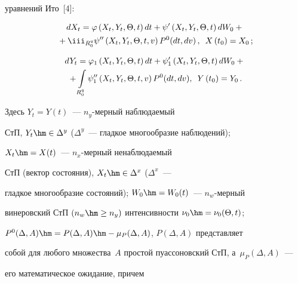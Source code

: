 уравнений Ито~[4]:

    \begin{multline}

    dX_t =\varphi \left(X_t,Y_t,\Theta, t\right) dt + \psi' \left(X_t,Y_t,\Theta, t\right) dW_0 

+{}\\

{}+\iii_{R_0^q} \psi''    \left(X_t,Y_t,\Theta, t,v\right) P^0 (dt, dv)\,,\enskip 

X\left(t_0\right) = X_0\,;\label{e2.1-s2}

\end{multline}



\vspace*{-12pt}



\noindent

    \begin{multline}

    dY_t =\varphi_1 \left(X_t,Y_t,\Theta, t\right) dt +

    \psi_1' \left(X_t,Y_t,\Theta, t\right) dW_0 + {}\\

    {}+

    \int\limits_{R_0^q} \psi_1'' \left(X_t,Y_t,\Theta, t,v\right) P^0

    (dt,dv),\enskip Y\left(t_0\right) = Y_0\,.\label{e2.2-s2}

    \end{multline}

Здесь $Y_t=Y(t)$~--- $n_y$-мер\-ный наблюдаемый

СтП, $Y_t \hm\in \Delta^y$ ($\Delta^y$~--- гладкое многообразие наблюдений); 

$X_t \hm=X(t)$~--- $n_x$-мер\-ный ненаблюдаемый

СтП (вектор состояния), $X_t \hm\in \Delta^x$ ($\Delta^x$~--- 

гладкое многообразие состояний); $W_0 \hm=W_0(t)$~--- $n_w$-мер\-ный

винеровский СтП $(n_w\hm\ge n_y)$ интенсивности  $\nu_0 \hm=\nu_0 (\Theta, t)$; 

$P^0(\Delta,A)\hm=P(\Delta,A)\hm-\mu_P (\Delta,A)$, $P(\Delta,A)$  представляет 

собой для любого множества~$A$ простой пуассоновский СтП, а~$\mu_P (\Delta,A)$~--- 

его математическое ожидание, причем

    $$

